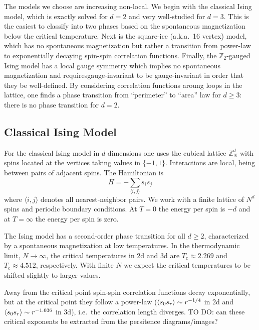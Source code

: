 \documentclass[11pt]{article}
\begin{document}
The models we choose are increasing non-local. We begin with the classical Ising model, which is exactly solved for $d=2$ and very well-studied for $d=3$. This is the easiest to classify into two phases based on the spontaneous magnetization below the critical temperature. Next is the square-ice (a.k.a.~16 vertex) model, which has no spontaneous magnetization but rather a transition from power-law to exponentially decaying spin-spin correlation functions. Finally, the $\mathbb{Z}_2$-gauged Ising model has a local gauge symmetry which implies no spontaneous magnetization and requiresgauge-invariant to be gauge-invariant in order that they be well-defined. By considering correlation functions aroung loops in the lattice, one finds a phase transition from ``perimeter'' to ``area'' law for $d\geq 3$: there is no phase transition for $d=2$.

\newpage
\subsection{Classical Ising Model}
For the classical Ising model in $d$ dimensions one uses the cubical lattice $\mathbb{Z}_N^d$ with spins located at the vertices taking values in $\{{-1},1\}$. Interactions are local, being between pairs of adjacent spins. The Hamiltonian is
\begin{equation}
    H = -\sum_{\langle i,j\rangle}s_is_j
\end{equation}
where $\langle i,j\rangle$ denotes all nearest-neighbor pairs. We work with a finite lattice of $N^d$ spins and periodic boundary conditions. At $T=0$ the energy per spin is $-d$ and at $T=\infty$ the energy per spin is zero.

The Ising model has a second-order phase transition for all $d\geq 2$, characterized by a spontaneous magnetization at low temperatures. In the thermodynamic limit, $N\to\infty$, the critical temperatures in 2d and 3d are $T_\text{c}\approx 2.269$ and $T_\text{c}\approx4.512$, respectively. With finite $N$ we expect the critical temperatures to be shifted slightly to larger values.

Away from the critical point spin-spin correlation functions decay exponentially, but at the critical point they follow a power-law ($\ev{s_0s_r}\sim r^{-1/4}$ in 2d and $\ev{s_0s_r}\sim r^{-1.036}$ in 3d), i.e.~the correlation length diverges. TO DO: can these critical exponents be extracted from the persitence diagrams/images?
\end{document}
